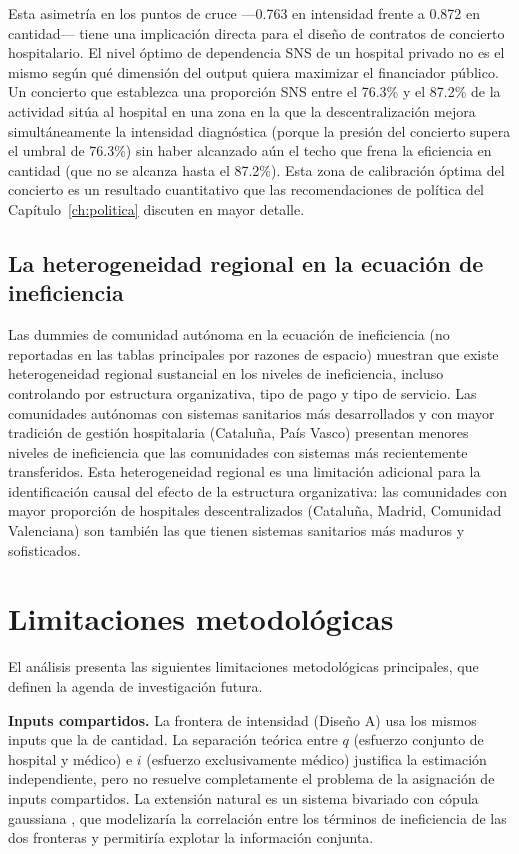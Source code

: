 \documentclass[12pt, a4paper, twoside, openright]{book}
\theoremstyle{plain}
\theoremstyle{definition}
\theoremstyle{remark}
\begin{document}
Esta asimetría en los puntos de cruce ---0.763 en intensidad frente a 0.872 en cantidad--- tiene una implicación directa para el diseño de contratos de concierto hospitalario. El nivel óptimo de dependencia SNS de un hospital privado no es el mismo según qué dimensión del output quiera maximizar el financiador público. Un concierto que establezca una proporción SNS entre el 76.3\% y el 87.2\% de la actividad sitúa al hospital en una zona en la que la descentralización mejora simultáneamente la intensidad diagnóstica (porque la presión del concierto supera el umbral de 76.3\%) sin haber alcanzado aún el techo que frena la eficiencia en cantidad (que no se alcanza hasta el 87.2\%). Esta zona de calibración óptima del concierto es un resultado cuantitativo que las recomendaciones de política del Capítulo~\ref{ch:politica} discuten en mayor detalle.

\subsection{La heterogeneidad regional en la ecuación de ineficiencia}

Las dummies de comunidad autónoma en la ecuación de ineficiencia (no reportadas en las tablas principales por razones de espacio) muestran que existe heterogeneidad regional sustancial en los niveles de ineficiencia, incluso controlando por estructura organizativa, tipo de pago y tipo de servicio. Las comunidades autónomas con sistemas sanitarios más desarrollados y con mayor tradición de gestión hospitalaria (Cataluña, País Vasco) presentan menores niveles de ineficiencia que las comunidades con sistemas más recientemente transferidos. Esta heterogeneidad regional es una limitación adicional para la identificación causal del efecto de la estructura organizativa: las comunidades con mayor proporción de hospitales descentralizados (Cataluña, Madrid, Comunidad Valenciana) son también las que tienen sistemas sanitarios más maduros y sofisticados.

\section{Limitaciones metodológicas}

El análisis presenta las siguientes limitaciones metodológicas principales, que definen la agenda de investigación futura.

\textbf{Inputs compartidos.} La frontera de intensidad (Diseño A) usa los mismos inputs que la de cantidad. La separación teórica entre $q$ (esfuerzo conjunto de hospital y médico) e $i$ (esfuerzo exclusivamente médico) justifica la estimación independiente, pero no resuelve completamente el problema de la asignación de inputs compartidos. La extensión natural es un sistema bivariado con cópula gaussiana \citep{kumbhakar1997}, que modelizaría la correlación entre los términos de ineficiencia de las dos fronteras y permitiría explotar la información conjunta.
\end{document}
